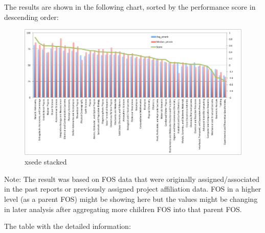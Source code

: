\documentclass{sig-alternate}
\begin{document}
The results are shown in the following chart, sorted by the performance score in descending order:


\begin{figure}[htb] 
  \centering 
    \includegraphics[width=1.0\textwidth]{images-new/a.pdf} 
  \caption{xsede stacked}\label{F:xsede-stacked} 
\end{figure} 


Note: The result was based on FOS data that were originally assigned/associated in the past reports or previously assigned project affiliation data. FOS in a higher level (as a parent FOS) might be showing here but the values might be changing in later analysis after aggregating more children FOS into that parent FOS.

The table with the detailed information:
\end{document}
